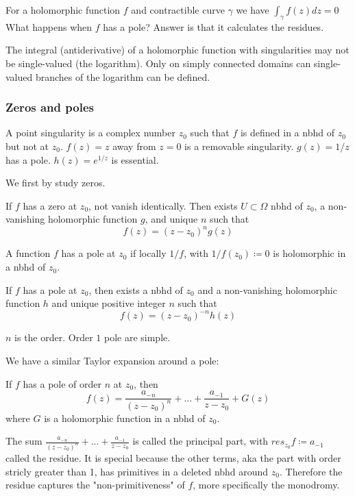 \documentclass[main.tex]{subfiles}
\begin{document}
For a holomorphic function $f$ and contractible curve $\gamma$ we have 
$
\int_\gamma f(z) dz = 0
$
What happens when $f$ has a pole? Answer is that it calculates the residues.

The integral (antiderivative) of a holomorphic function with singularities may not be single-valued (the logarithm). Only on simply connected domains can single-valued branches of the logarithm can be defined.

\subsubsection{Zeros and poles}
A point singularity is a complex number $z_0$ such that $f$ is defined in a nbhd of $z_0$ but not at $z_0$. $f(z) = z$ away from $z = 0$ is a removable singularity. $g(z) = 1/z$ has a pole. $h(z) = e^{1/z}$ is essential.

We first by study zeros. 
\begin{theorem}
If $f$ has a zero at $z_0$, not vanish identically. Then exists $U \subset \Omega$ nbhd of $z_0$, a non-vanishing holomorphic function $g$, and unique $n$ such that 
$$
f(z) = (z - z_0)^n g(z)
$$
\end{theorem}

A function $f$ has a pole at $z_0$ if locally $1/f$, with $1/f(z_0) \coloneqq 0$ is holomorphic in a nbhd of $z_0$.

\begin{theorem}
If $f$ has a pole at $z_0$, then exists a nbhd of $z_0$ and a non-vanishing holomorphic function $h$ and unique positive integer $n$ such that 
$$
f(z) = (z-z_0)^{-n} h(z)
$$
\end{theorem}
$n$ is the order. Order $1$ pole are simple.

We have a similar Taylor expansion around a pole:

\begin{theorem}
If $f$ has a pole of order $n$ at $z_0$, then
$$
f(z) = \frac{a_{-n}}{(z-z_0)^n} + ... + \frac{a_{-1}}{z-z_0} + G(z)
$$
where $G$ is a holomorphic function in a nbhd of $z_0$.
\end{theorem}
The sum $\frac{a_{-n}}{(z-z_0)^n} + ... + \frac{a_{-1}}{z-z_0}$ is called the principal part, with $res_{z_0} f \coloneqq a_{-1}$ called the residue. It is special because the other terms, aka the part with order stricly greater than 1, has primitives in a deleted nbhd around $z_0$. Therefore the residue captures the "non-primitiveness" of $f$, more specifically the monodromy.
\end{document}
